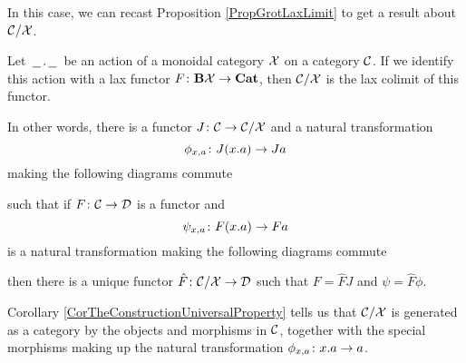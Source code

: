 \documentclass{article}
\begin{document}
In this case, we can recast Proposition \ref{PropGrotLaxLimit} to get a result about ${\mathcal{C}}/\mathcal X$.

\begin{corollary}
  Let $\,\underline{\hspace{1.5ex}}\,.\,\underline{\hspace{1.5ex}}\,$ be an action of a monoidal category $\mathcal X$ on a category ${\mathcal{C}}$.  
  If we identify this action with a lax functor $F \colon \mathbf B \mathcal X \to {\normalfont\textbf{Cat}}$, then ${\mathcal{C}}/\mathcal X$ is the lax colimit of this functor.

  In other words, there is a functor $J\colon {\mathcal{C}} \to {\mathcal{C}}/\mathcal X$ and a natural transformation
  \[
    \phi_{x,a}\colon J(x.a) \to Ja
    \]
  making the following diagrams commute
  such that if $F\colon {\mathcal{C}} \to {\mathcal{D}}$ is a functor and
  \[
    \psi_{x,a} \colon F(x.a) \to Fa
    \]
   is a natural transformation making the following diagrams commute
  then there is a unique functor $\hat{F}\colon {\mathcal{C}}/\mathcal X\to {\mathcal{D}}$ such that $F=\hat{F}J$ and $\psi=\hat{F}\phi$.
  \label{CorTheConstructionUniversalProperty}
\end{corollary}

Corollary \ref{CorTheConstructionUniversalProperty} tells us that ${\mathcal{C}}/\mathcal X$ is generated as a category by the objects and morphisms in ${\mathcal{C}}$, together with the special morphisms making up the natural transformation $\phi_{x,a}\colon x.a \to a$.  
\end{document}
